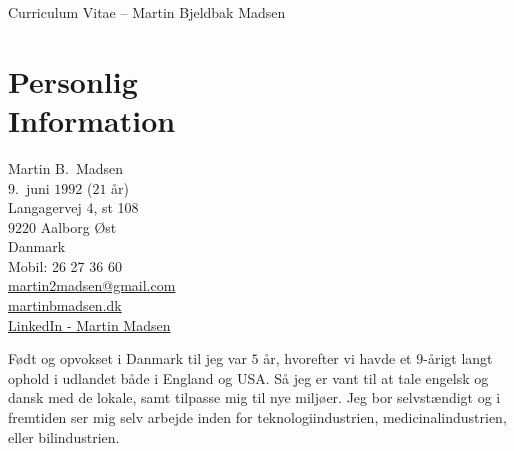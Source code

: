 \documentclass[margin,line,a4paper]{resume}
\begin{document}
\raggedright
{\sc \Large Curriculum Vitae -- Martin Bjeldbak Madsen}
\begin{resume}
    \vspace{0.5cm}
    \begin{figure}
         \vspace{-1cm}
        \begin{center}
        \end{center}
         \vspace{-2cm}
    \end{figure}

    \section{\mysidestyle Personlig\\Information}%
    Martin B.\ Madsen\\
    $9$.\ juni $1992$ ($21$ år)\\ 
    Langagervej 4, st 108\\
    $9220$ Aalborg Øst\\
    Danmark\\
    Mobil: 26 27 36 60\\
    \href{mailto:martin2madsen@gmail.com}{martin2madsen@gmail.com}\\
    \href{http://www.martinbmadsen.dk}{martinbmadsen.dk}\\
    \href{http://dk.linkedin.com/pub/martin-madsen/21/9b0/b0}{LinkedIn - Martin Madsen}
    \vspace{1cm}

    Født og opvokset i Danmark til jeg var $5$ år, hvorefter vi havde et
    $9$-årigt langt ophold i udlandet både i England og USA. Så jeg er
    vant til at tale engelsk og dansk med de lokale, samt tilpasse mig
    til nye miljøer. Jeg bor selvstændigt og i fremtiden ser mig selv
    arbejde inden for teknologiindustrien, medicinalindustrien, eller
    bilindustrien.


\end{resume}
\end{document}
